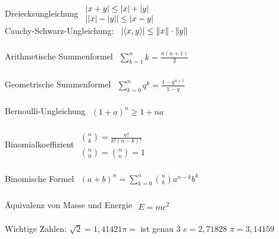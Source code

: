 \documentclass[german]{latex4ei/latex4ei_sheet}
\begin{document}
\begin{sectionbox}
Dreiecksungleichung \qquad \qquad \qquad
\begin{math}\begin{array}{l}
	\left\vert x + y\right\vert \le \left\vert x\right\vert + \left\vert y\right\vert \\
	\left\vert\left\vert x\right\vert- \left\vert y\right\vert\right\vert \le \left\vert x-y\right\vert
\end{array}\end{math} \\
Cauchy-Schwarz-Ungleichung: \qquad
\begin{math}\begin{array}{l}
\left| \left\langle x, y \right\rangle  \right| \le \| x\| \cdot \| y\|
\end{array}\end{math} \\
\\
Arithmetische Summenformel \qquad
\begin{math}\begin{array}{l}
	\sum\limits_{k = 1}^{n}k = \frac{n (n+1)}{2}
\end{array}\end{math}  \\
\\
Geometrische Summenformel \qquad
\begin{math}\begin{array}{l}
	\sum\limits_{k = 0}^{n}q^k = \frac{1 - q^{n+1}}{1-q}
\end{array}\end{math}\\
\\
Bernoulli-Ungleichung \qquad \qquad \quad
\begin{math}\begin{array}{l}
	(1+a)^n \ge 1 + na
\end{array}\end{math}\\
\\
Binomialkoeffizient \qquad \qquad \qquad
\begin{math}\begin{array}{l}
	\binom{n}{k} = \frac{n!}{k!(n-k)!}  \\
	\binom{n}{0} = \binom{n}{n} = 1
\end{array}\end{math}\\
\\
Binomische Formel \qquad \qquad \qquad
\begin{math}\begin{array}{l}
	(a+b)^n = \sum\limits_{k = 0}^{n} \binom{n}{k} a^{n-k} b^{k}
\end{array}\end{math}   \\
\\
Äquivalenz von Masse und Energie
\begin{math}\begin{array}{l}
	E = mc^2
\end{array}\end{math}\\
\\
Wichtige Zahlen: $\sqrt{2} = 1,41421$\quad $\pi=$ ist genau 3 \quad $e = 2,71828$ \quad $\pi =  3,14159$


\end{sectionbox}
\end{document}
